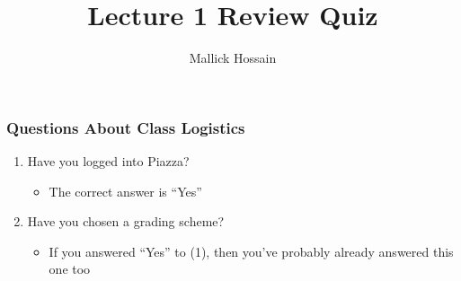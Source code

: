 \documentclass{beamer}
\title{Lecture 1 Review Quiz}
\author{Mallick Hossain}
\date{}
\institute{University of Pennsylvania}
\begin{document}
\begin{frame}
	\titlepage 
\end{frame} 

\begin{frame}
\frametitle{Questions About Class Logistics}
    \begin{enumerate}[<+- | alert@+>]
        \item Have you logged into Piazza?
            \begin{itemize}
                \item The correct answer is ``Yes''
            \end{itemize}
        \item Have you chosen a grading scheme?
            \begin{itemize}
                \item If you answered ``Yes'' to (1), then you've probably already answered this one too
            \end{itemize}
    \end{enumerate}
\end{frame} 
\end{document}
